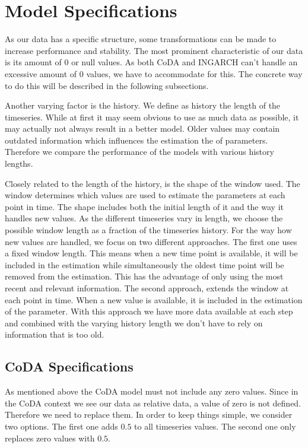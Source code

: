 \section{Model Specifications}
\label{sec: Model Specification}

As our data has a specific structure, some transformations can be made to increase performance and stability. The most prominent characteristic of our data is its amount of 0 or null values. As both CoDA and INGARCH can't handle an excessive amount of 0 values, we have to accommodate for this. The concrete way to do this will be described in the following subsections. 

Another varying factor is the history. We define as history the length of the timeseries. While at first it may seem obvious to use as much data as possible, it may actually not always result in a better model. Older values may contain outdated information which influences the estimation the of parameters. Therefore we compare the performance of the models with various history lengths. 

Closely related to the length of the history, is the shape of the window used. The window determines which values are used to estimate the parameters at each point in time. The shape includes both the initial length of it and the way it handles new values. As the different timeseries vary in length, we choose the possible window length as a fraction of the timeseries history. For the way how new values are handled, we focus on two different approaches. The first one uses a fixed window length. This means when a new time point is available, it will be included in the estimation while simultaneously the oldest time point will be removed from the estimation. This has the advantage of only using the most recent and relevant information. The second approach, extends the window at each point in time. When a new value is available, it is included in the estimation of the parameter. With this approach we have more data available at each step and combined with the varying history length we don't have to rely on information that is too old.

\subsection{CoDA Specifications}
\label{sec: Coda Specifications}

As mentioned above the CoDA model must not include any zero values. Since in the CoDA context we see our data as relative data, a value of zero is not defined. Therefore we need to replace them. In order to keep things simple, we consider two options. The first one adds $0.5$ to all timeseries values. The second one only replaces zero values with $0.5$.

